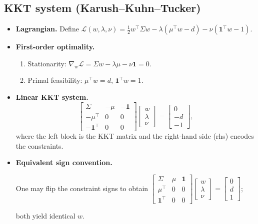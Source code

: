 \documentclass[11pt]{article}
\begin{document}
	\subsection{KKT system (Karush--Kuhn--Tucker)}
	\begin{itemize}
		\item \textbf{Lagrangian.} Define $\mathcal{L}(w,\lambda,\nu)=\tfrac12 w^\top \Sigma w-\lambda(\mu^\top w-d)-\nu(\mathbf{1}^\top w-1)$.
		\item \textbf{First-order optimality.}
		\begin{enumerate}
			\item Stationarity: $\nabla_w\mathcal{L}=\Sigma w-\lambda\mu-\nu\mathbf{1}=0$.
			\item Primal feasibility: $\mu^\top w=d$, $\mathbf{1}^\top w=1$.
		\end{enumerate}
		\item \textbf{Linear KKT system.}
		\begin{equation}\label{eq:kkt}
			\begin{bmatrix}
				\Sigma & -\mu & -\mathbf{1} \\
				-\mu^\top & 0 & 0 \\
				-\mathbf{1}^\top & 0 & 0
			\end{bmatrix}
			\begin{bmatrix}
				w \\ \lambda \\ \nu
			\end{bmatrix}
			=
			\begin{bmatrix}
				0 \\ -d \\ -1
			\end{bmatrix},
		\end{equation}
		where the left block is the KKT matrix and the right-hand side (rhs) encodes the constraints.
		\item \textbf{Equivalent sign convention.} 
		
		One may flip the constraint signs to obtain
		$\begin{bmatrix}\Sigma & \mu & \mathbf{1}\\ \mu^\top & 0 & 0\\ \mathbf{1}^\top & 0 & 0\end{bmatrix}
		\begin{bmatrix}w\\ \lambda\\ \nu\end{bmatrix}
		=
		\begin{bmatrix} 0\\ d \\ 1\end{bmatrix}$;
		
		 both yield identical $w$.
	\end{itemize}
	
\end{document}
